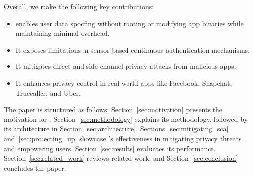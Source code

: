 \noindent Overall, we make the following key contributions:
\begin{itemize}[noitemsep, topsep=0pt]
\item \framework{} enables user data spoofing without rooting or modifying app binaries while maintaining minimal overhead.
\item It exposes limitations in sensor-based continuous authentication mechanisms.
\item It mitigates direct and side-channel privacy attacks from malicious apps.
\item It enhances privacy control in real-world apps like Facebook, Snapchat, Truecaller, and Uber.
\end{itemize}

The paper is structured as follows: Section~\ref{sec:motivation} presents the motivation for \framework{}. Section~\ref{sec:methodology} explains its methodology, followed by its architecture in Section~\ref{sec:architecture}. Sections~\ref{sec:mitigating_sca} and~\ref{sec:protecting_up} showcase \framework{}'s effectiveness in mitigating privacy threats and empowering users. Section~\ref{sec:results} evaluates its performance. Section~\ref{sec:related_work} reviews related work, and Section~\ref{sec:conclusion} concludes the paper.
